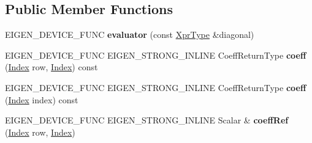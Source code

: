 \subsection*{Public Member Functions}
\begin{DoxyCompactItemize}
\item 
\mbox{\label{struct_eigen_1_1internal_1_1evaluator_3_01_diagonal_3_01_arg_type_00_01_diag_index_01_4_01_4_a520064af9f6dc7424ea66f641d50cd46}} 
E\+I\+G\+E\+N\+\_\+\+D\+E\+V\+I\+C\+E\+\_\+\+F\+U\+NC {\bfseries evaluator} (const \hyperlink{group___core___module_class_eigen_1_1_diagonal}{Xpr\+Type} \&diagonal)
\item 
\mbox{\label{struct_eigen_1_1internal_1_1evaluator_3_01_diagonal_3_01_arg_type_00_01_diag_index_01_4_01_4_abc2e122d0f8923b27883b07280241973}} 
E\+I\+G\+E\+N\+\_\+\+D\+E\+V\+I\+C\+E\+\_\+\+F\+U\+NC E\+I\+G\+E\+N\+\_\+\+S\+T\+R\+O\+N\+G\+\_\+\+I\+N\+L\+I\+NE Coeff\+Return\+Type {\bfseries coeff} (\hyperlink{namespace_eigen_a62e77e0933482dafde8fe197d9a2cfde}{Index} row, \hyperlink{namespace_eigen_a62e77e0933482dafde8fe197d9a2cfde}{Index}) const
\item 
\mbox{\label{struct_eigen_1_1internal_1_1evaluator_3_01_diagonal_3_01_arg_type_00_01_diag_index_01_4_01_4_a3e5b569223036cceb13d67088451f6f7}} 
E\+I\+G\+E\+N\+\_\+\+D\+E\+V\+I\+C\+E\+\_\+\+F\+U\+NC E\+I\+G\+E\+N\+\_\+\+S\+T\+R\+O\+N\+G\+\_\+\+I\+N\+L\+I\+NE Coeff\+Return\+Type {\bfseries coeff} (\hyperlink{namespace_eigen_a62e77e0933482dafde8fe197d9a2cfde}{Index} index) const
\item 
\mbox{\label{struct_eigen_1_1internal_1_1evaluator_3_01_diagonal_3_01_arg_type_00_01_diag_index_01_4_01_4_a5ba4113dd171a53a9714dd8fb09e3d4e}} 
E\+I\+G\+E\+N\+\_\+\+D\+E\+V\+I\+C\+E\+\_\+\+F\+U\+NC E\+I\+G\+E\+N\+\_\+\+S\+T\+R\+O\+N\+G\+\_\+\+I\+N\+L\+I\+NE Scalar \& {\bfseries coeff\+Ref} (\hyperlink{namespace_eigen_a62e77e0933482dafde8fe197d9a2cfde}{Index} row, \hyperlink{namespace_eigen_a62e77e0933482dafde8fe197d9a2cfde}{Index})
\item 

\end{DoxyCompactItemize}
